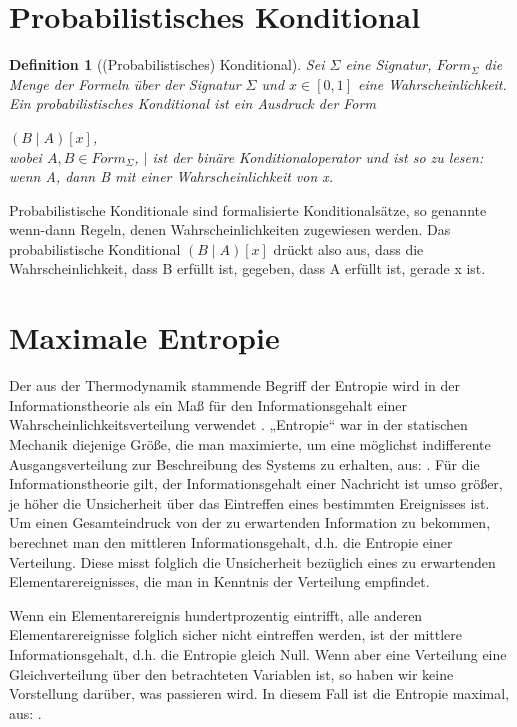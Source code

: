 \documentclass[a4paper, 11pt]{book}
\newtheorem{Def}{Definition }[section]
\begin{document}
\section{Probabilistisches Konditional}
\label{probKond}
\begin{Def}[(Probabilistisches) Konditional] 
Sei $ \Sigma $ eine Signatur, $ Form_{\Sigma} $ die Menge der Formeln über der Signatur $ \Sigma $ und $ x \in [0, 1] $ eine Wahrscheinlichkeit.
Ein probabilistisches Konditional ist ein Ausdruck der Form

\hspace{3 cm} $ (B \mid A)[x] $, \\
wobei $ A, B \in Form_\Sigma $, $ \mid $ ist der binäre Konditionaloperator und ist so zu lesen: wenn A, dann B mit einer Wahrscheinlichkeit von x. 
\end{Def}
Probabilistische Konditionale sind formalisierte Konditionalsätze, so genannte wenn-dann Regeln, denen Wahrscheinlichkeiten zugewiesen werden.
Das probabilistische Konditional $ (B \mid A)[x] $ drückt also aus, dass die Wahrscheinlichkeit, dass B erfüllt ist, gegeben, dass A erfüllt ist, gerade x ist.




\section{Maximale Entropie} 
\label{MaxEnt}
Der aus der Thermodynamik stammende Begriff der Entropie wird in der Informationstheorie als ein Maß für den Informationsgehalt einer Wahrscheinlichkeitsverteilung verwendet \cite{RKI97}.
„Entropie“ war in der statischen Mechanik diejenige Größe, die man maximierte, um eine möglichst indifferente Ausgangsverteilung zur Beschreibung des Systems zu erhalten, aus: \cite{BKI08}.
Für die Informationstheorie gilt, der Informationsgehalt einer Nachricht ist umso größer, je höher die Unsicherheit über das Eintreffen eines bestimmten Ereignisses ist. Um einen Gesamteindruck von der zu erwartenden Information zu bekommen, berechnet man den mittleren Informationsgehalt, d.h. die Entropie einer Verteilung. Diese misst folglich die Unsicherheit bezüglich eines zu erwartenden Elementarereignisses, die man in Kenntnis der Verteilung empfindet.

Wenn ein Elementarereignis hundertprozentig eintrifft, alle anderen Elementarereignisse folglich sicher nicht eintreffen werden, ist der mittlere Informationsgehalt, d.h. die Entropie gleich Null. Wenn aber eine Verteilung eine Gleichverteilung über den betrachteten Variablen ist, so haben wir keine Vorstellung darüber, was passieren wird. In diesem Fall ist die Entropie maximal, aus: \cite{BKI08}.
\end{document}
